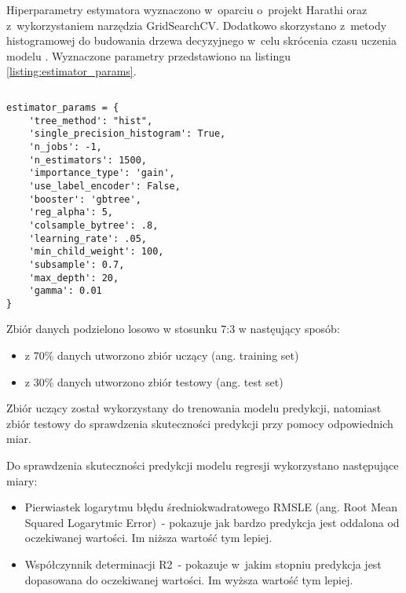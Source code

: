 Hiperparametry estymatora wyznaczono w~oparciu o~projekt Harathi \cite{harathi-2018} oraz z~wykorzystaniem narzędzia GridSearchCV.
Dodatkowo skorzystano z~metody histogramowej do budowania drzewa decyzyjnego w~celu skrócenia czasu uczenia modelu \cite{golarnyk-2021}.
Wyznaczone parametry przedstawiono na listingu \ref{listing:estimator_params}.


\noindent\begin{minipage}{\textwidth}
             \begin{lstlisting}[caption={Parametry estmatora}, label={listing:estimator_params}]
             \end{lstlisting}
             \hspace{.075\textwidth}\begin{minipage}{.85\textwidth}
                                        \begin{verbatim}
estimator_params = {
    'tree_method': "hist",
    'single_precision_histogram': True,
    'n_jobs': -1,
    'n_estimators': 1500,
    'importance_type': 'gain',
    'use_label_encoder': False,
    'booster': 'gbtree',
    'reg_alpha': 5,
    'colsample_bytree': .8,
    'learning_rate': .05,
    'min_child_weight': 100,
    'subsample': 0.7,
    'max_depth': 20,
    'gamma': 0.01
}
                                        \end{verbatim}
             \end{minipage}

             \raggedright\source{\ownwork}
             \vspace{0.75cm}
\end{minipage}

Zbiór danych podzielono losowo w stosunku 7:3 w nastęujący sposób:
\begin{itemize}
    \item z 70\% danych utworzono zbiór uczący (ang. training set)
    \item z 30\% danych utworzono zbiór testowy (ang. test set)
\end{itemize}

Zbiór uczący został wykorzystany do trenowania modelu predykcji, natomiast zbiór testowy do sprawdzenia skuteczności predykcji przy pomocy odpowiednich miar.

Do sprawdzenia skuteczności predykcji modelu regresji wykorzystano następujące miary:
\begin{itemize}
    \item Pierwiastek logarytmu błędu średniokwadratowego RMSLE (ang. Root Mean Squared Logarytmic Error)~- pokazuje jak bardzo predykcja jest oddalona od oczekiwanej wartości. Im niższa wartość tym lepiej.
    \item Współczynnik determinacji R2~- pokazuje w~jakim stopniu predykcja jest dopasowana do oczekiwanej wartości. Im wyższa wartość tym lepiej.
\end{itemize}

